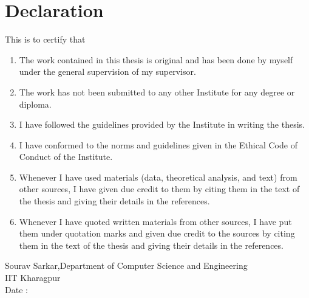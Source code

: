 \documentclass{article}
\begin{document}

\clearpage
\section*{Declaration}

This is to certify that
\begin{enumerate}
\item The work contained in this thesis is original and has been done by myself under the
general supervision of my supervisor.

\item The work has not been submitted to any other Institute for any degree or diploma. 

\item I have followed the guidelines provided by the Institute in writing the thesis.

\item I have conformed to the norms and guidelines given in the Ethical Code of Conduct
of the Institute.

\item Whenever I have used materials (data, theoretical analysis, and text) from other
sources, I have given due credit to them by citing them in the text of the thesis and
giving their details in the references.

\item Whenever I have quoted written materials from other sources, I have put them under
quotation marks and given due credit to the sources by citing them in the text of
the thesis and giving their details in the references.
\end{enumerate}
\vspace{2cm}
Sourav Sarkar,Department of Computer Science and Engineering\\
IIT Kharagpur\\
Date :\\

\clearpage


\clearpage


 


\end{document}
